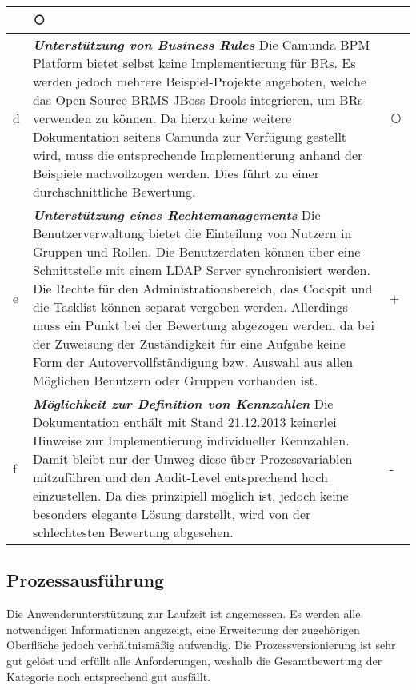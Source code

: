 \begin{longtabu}{@{\extracolsep{\fill}}|p{0.5cm}|X|p{2cm}|}
 & \centering\arraybackslash \textcircled{} \tabularnewline
\hline
 d 
 & \textit{\textbf{Unterstützung von Business Rules}} \newline Die Camunda BPM Platform bietet selbst keine Implementierung für \ac{BR}s. Es werden jedoch mehrere Beispiel-Projekte angeboten, welche das Open Source \ac{BRMS} JBoss Drools integrieren, um \ac{BR}s verwenden zu können. Da hierzu keine weitere Dokumentation seitens Camunda  zur Verfügung gestellt wird, muss die entsprechende Implementierung anhand der Beispiele nachvollzogen werden. Dies führt zu einer durchschnittliche Bewertung. \smallskip
 & \centering\arraybackslash \textcircled{} \tabularnewline
\hline
 e 
 & \textit{\textbf{Unterstützung eines Rechtemanagements}} \newline  Die Benutzerverwaltung bietet die Einteilung von Nutzern in Gruppen und Rollen. Die Benutzerdaten können über eine Schnittstelle mit einem \ac{LDAP} Server synchronisiert werden. Die Rechte für den Administrationsbereich, das Cockpit und die Tasklist können separat vergeben werden. Allerdings muss ein Punkt bei der Bewertung abgezogen werden, da bei der Zuweisung der Zuständigkeit für eine Aufgabe keine Form der Autovervollfständigung bzw. Auswahl aus allen Möglichen Benutzern oder Gruppen vorhanden ist. \smallskip
 & \centering\arraybackslash \textcircled{+} \tabularnewline
\hline
 f \label{camundaDefKPI}
 & \textit{\textbf{Möglichkeit zur Definition von Kennzahlen}} \newline  Die Dokumentation enthält mit Stand 21.12.2013 keinerlei Hinweise zur Implementierung individueller Kennzahlen. Damit bleibt nur der Umweg diese über Prozessvariablen mitzuführen und den Audit-Level entsprechend hoch einzustellen. Da dies prinzipiell möglich ist, jedoch keine besonders elegante Lösung darstellt, wird von der schlechtesten Bewertung abgesehen. \smallskip
 & \centering\arraybackslash \textcircled{-} \tabularnewline
\hline
\end{longtabu}
\normalsize


\subsection{Prozessausführung}

Die Anwenderunterstützung zur Laufzeit ist angemessen. Es werden alle notwendigen Informationen angezeigt, eine Erweiterung der zugehörigen Oberfläche jedoch verhältnismäßig aufwendig. Die Prozessversionierung ist sehr gut gelöst und erfüllt alle Anforderungen, weshalb die Gesamtbewertung der Kategorie noch entsprechend gut ausfällt.

